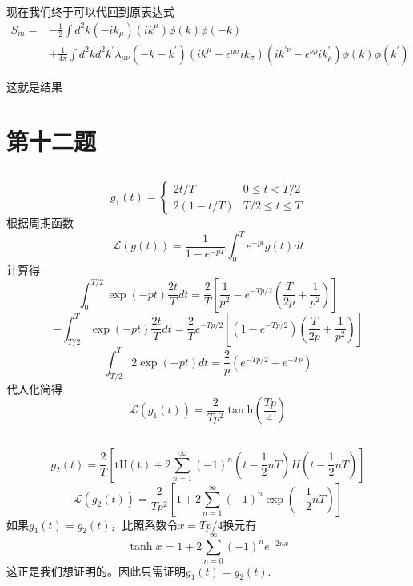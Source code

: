 \documentclass[a4paper]{ctexart}
\begin{document}
现在我们终于可以代回到原表达式
$$
    \begin{aligned}
        S_{m}
        = & -\frac{1}{2} \int d^{2} k\left(-i k_{\mu}\right)\left(i k^{\mu}\right) \phi(k) \phi(-k)                                                                                                                                                                      \\
          & +\frac{1}{4 \pi} \int d^{2} k d^{2} k^{\prime} \lambda_{\mu \nu}\left(-k-k^{\prime}\right)\left(i k^{\mu}-\epsilon^{\mu \sigma} i k_{\sigma}\right)\left(i k^{\prime \nu}-\epsilon^{\nu \rho} i k_{\rho}^{\prime}\right) \phi(k) \phi\left(k^{\prime}\right)
    \end{aligned}
$$

这就是结果

\section{第十二题}
\subsection{}
$$
    g_1(t)=\left\{\begin{array}{cc}
        2 t / T    & 0 \leq t<T / 2      \\
        2(1-t / T) & T / 2 \leq t \leq T
    \end{array}\right.
$$
根据周期函数
$$
    \mathcal{L}\left( g\left( t \right) \right) =
    \frac{1}{1-e^{-p T}} \int_{0}^{T} e^{-p t} g(t) d t
$$
计算得
$$
    \int_0^{T/2}{\exp \left( -pt \right) \frac{2t}{T}dt=\frac{2}{T}}\left[ \frac{1}{p^2}-e^{-Tp/2}\left( \frac{T}{2p}+\frac{1}{p^2} \right) \right]
$$
$$
    -\int_{T/2}^T{\exp \left( -pt \right) \frac{2t}{T}dt=\frac{2}{T}}e^{-Tp/2}\left[ \left( 1-e^{-Tp/2} \right) \left( \frac{T}{2p}+\frac{1}{p^2} \right) \right]
$$
$$
    \int_{T/2}^T{2\exp \left( -pt \right) dt=\frac{2}{p}}\left( e^{-Tp/2}-e^{-Tp} \right)
$$
代入化简得
$$
    \mathcal{L}\left( g_1\left( t \right) \right) =\frac{2}{Tp^2}\tan\text{h}\left( \frac{Tp}{4} \right)
$$
\subsection{}
$$
    g_2\left( t \right) =\frac{2}{T}\left[ \text{tH}\left( \text{t} \right) +2\sum_{n=1}^{\infty}{\left( -1 \right)}^n\left( t-\frac{1}{2}nT \right) H\left( t-\frac{1}{2}nT \right) \right]
$$
$$
    \mathcal{L}\left( g_2\left( t \right) \right) =\frac{2}{Tp^2}\left[ 1+2\sum_{n=1}^{\infty}{\left( -1 \right)}^n\exp \left( -\frac{1}{2}nT \right) \right]
$$
如果$g_1(t)=g_2(t)$，比照系数令$x=Tp/4$换元有
$$
    \tanh x=1+2 \sum_{n=0}^{\infty}(-1)^{n} e^{-2 n x}
$$
这正是我们想证明的。因此只需证明$g_1(t)=g_2(t)$.
\end{document}
